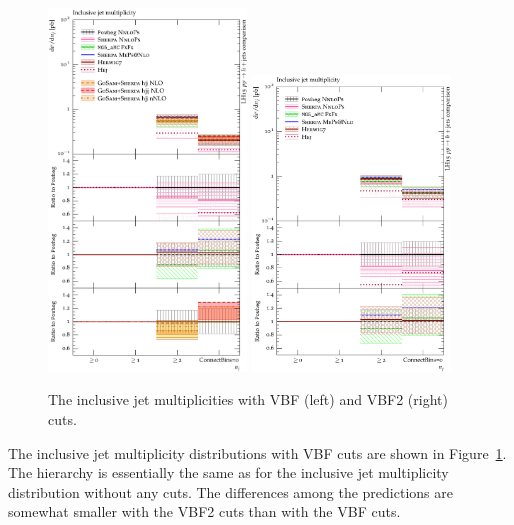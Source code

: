 \begin{figure}[t!]
  \centering
  \includegraphics[width=0.47\textwidth]{figures/hjetscomp_NJet_incl_30_VBF.pdf}
  \hfill
  \includegraphics[width=0.47\textwidth]{figures/hjetscomp_NJet_incl_30_VBF2.pdf}
  \caption{\label{fig:higgscomp:results:inclobs:njets_VBF}
    The inclusive jet multiplicities with VBF (left) and VBF2 (right)
    cuts.  }
\end{figure}

The inclusive jet multiplicity distributions with VBF cuts are shown
in Figure~\ref{fig:higgscomp:results:inclobs:njets_VBF}. The hierarchy
is essentially the same as for the inclusive jet multiplicity
distribution without any cuts. The differences among the predictions
are somewhat smaller with the VBF2 cuts than with the VBF cuts.

